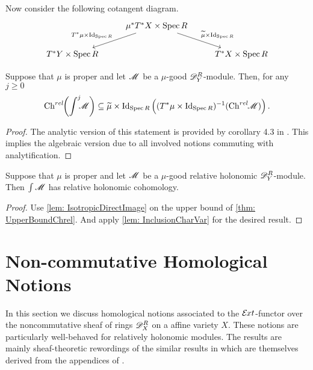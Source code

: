   Now consider the following cotangent diagram.
  $$
  \begin{tikzcd}
      & \mu^* T^* X\times \Spec R\arrow[swap]{ld}{T^* \mu \times \operatorname{Id}_{\Spec R}} \arrow{rd}{\widetilde{\mu}\times \operatorname{Id}_{\Spec R}} & \\
      T^* Y \times \Spec R& & T^*X\times \Spec R
  \end{tikzcd}
  $$
  \begin{theorem}\label{thm: UpperBoundChrel}
    Suppose that $\mu$ is proper and let $\mathscr{M}$ be a $\mu$-good $\mathscr{D}_Y^R$-module. Then, for any $j\geq 0$
    $$\operatorname{Ch}^{rel}\mkern-5mu\left(\int^j \mkern -8mu \mathscr{M} \right)\subseteq  \widetilde{\mu}\times \operatorname{Id}_{\operatorname{Spec} R}\left((T^*\mu \times \operatorname{Id}_{\operatorname{Spec} R})^{-1}(\operatorname{Ch}^{rel}\mkern-5mu \mathscr{M}) \right).$$
  \end{theorem}
  \begin{proof}
    The analytic version of this statement is provided by corollary 4.3 in \cite{schapira1994index}.
    This implies the algebraic version due to all involved notions commuting with analytification.
  \end{proof}
  \begin{theorem}\label{thm: RelHolConserved}
      Suppose that $\mu$ is proper and let $\mathscr{M}$ be a $\mu$-good relative holonomic $\mathscr{D}_Y^R$-module. Then $\int \mathscr{M}$ has relative holonomic cohomology.
  \end{theorem}
  \begin{proof}
    Use \cref{lem: IsotropicDirectImage} on the upper bound of \cref{thm: UpperBoundChrel}. And apply \cref{lem: InclusionCharVar} for the desired result.
  \end{proof}
\section{Non-commutative Homological Notions}\label{sec: NonComHomological}
In this section we discuss homological notions associated to the $\mathcal{E}\mkern -1mu xt$-functor over the noncommutative sheaf of rings $\mathscr{D}_X^R$ on a affine variety $X$.
These notions are particularly well-behaved for relatively holonomic modules.
The results are mainly sheaf-theoretic rewordings of the similar results in \cite{budur2019zero} which are themselves derived from the appendices of \cite{bjork1993analytic}.
